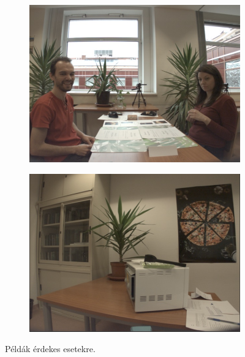 \begin{figure}
\begin{subfigure}[b]{0.45\linewidth}
        \includegraphics[width=\linewidth]{figures/video_examples/video_example_back_illumination.png}
    \end{subfigure}
    \begin{subfigure}[b]{0.45\linewidth}
        \includegraphics[width=\linewidth]{figures/video_examples/video_example_empty.png}
    \end{subfigure}
    \caption{Példák érdekes esetekre.}
    \label{fig:video_examples}
\end{figure}

